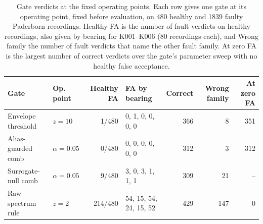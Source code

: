 \begin{table}[htbp]
\centering
\begingroup
\small
\setlength{\tabcolsep}{4pt}
\begin{tabular}{llrlrrr}
\toprule
Gate & Op. point & Healthy FA & FA by bearing & Correct & Wrong family & At zero FA \\
\midrule
Envelope threshold & $z=10$ & 1/480 & 0, 1, 0, 0, 0, 0 & 366 & 8 & 351 \\
Alias-guarded comb & $\alpha=0.05$ & 0/480 & 0, 0, 0, 0, 0, 0 & 312 & 3 & 312 \\
Surrogate-null comb & $\alpha=0.05$ & 9/480 & 3, 0, 3, 1, 1, 1 & 309 & 21 & -- \\
Raw-spectrum rule & $z=2$ & 214/480 & 54, 15, 54, 24, 15, 52 & 429 & 147 & 0 \\
\bottomrule
\end{tabular}\par
\endgroup
\caption{Gate verdicts at the fixed operating points. Each row gives one gate at its operating point, fixed before evaluation, on 480 healthy and 1839 faulty Paderborn recordings. Healthy FA is the number of fault verdicts on healthy recordings, also given by bearing for K001--K006 (80 recordings each), and Wrong family the number of fault verdicts that name the other fault family. At zero FA is the largest number of correct verdicts over the gate's parameter sweep with no healthy false acceptance.}
\label{tab:gates}
\end{table}
